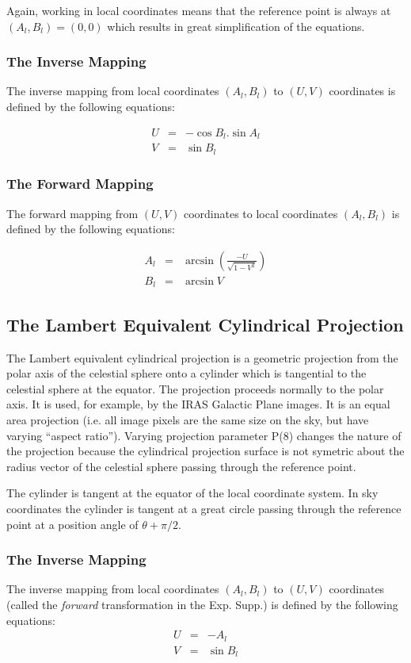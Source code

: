 Again, working in local coordinates means that the reference point is always at 
$(A_{l},B_{l})=(0,0)$ which results in great simplification of the equations.

\subsubsection {The Inverse Mapping}
The inverse mapping from local coordinates $(A_{l},B_{l})$ to $(U,V)$
coordinates is defined by the following equations:

\begin{eqnarray*}
U & = & -\cos B_{l}.\sin A_{l}\\
V & = & \sin B_{l}
\end{eqnarray*}

\subsubsection {The Forward Mapping}
The forward mapping from $(U,V)$ coordinates to local coordinates 
$(A_{l},B_{l})$ is defined by the following equations:

\begin{eqnarray*}
A_{l} & = & \arcsin \left( \frac{-U}{\sqrt{1-V^{2}}} \right)\\
B_{l} & = & \arcsin V
\end{eqnarray*}

\subsection {The Lambert Equivalent Cylindrical Projection}
The Lambert equivalent cylindrical projection is a geometric projection from the
polar axis of the celestial sphere onto a cylinder which is tangential to the
celestial sphere at the equator. The projection proceeds normally to the polar
axis. It is used, for example, by the IRAS Galactic Plane images. It is an equal
area projection (i.e. all image pixels are the same size on the sky, but have
varying ``aspect ratio''). Varying projection parameter P(8) changes the nature
of the projection because the cylindrical projection surface is not symetric
about the radius vector of the celestial sphere passing through the reference
point. 

The cylinder is tangent at the equator of the local coordinate system. In sky 
coordinates the cylinder is tangent at a great circle passing through the 
reference point at a position angle of $\theta+\pi/2$.

\subsubsection {The Inverse Mapping}
The inverse mapping from local coordinates $(A_{l},B_{l})$ to $(U,V)$
coordinates (called the {\em forward} transformation in the Exp. Supp.) is
defined by the following equations: 
\begin{eqnarray*}
U & = & -A_{l}\\
V & = & \sin B_{l}
\end{eqnarray*}

